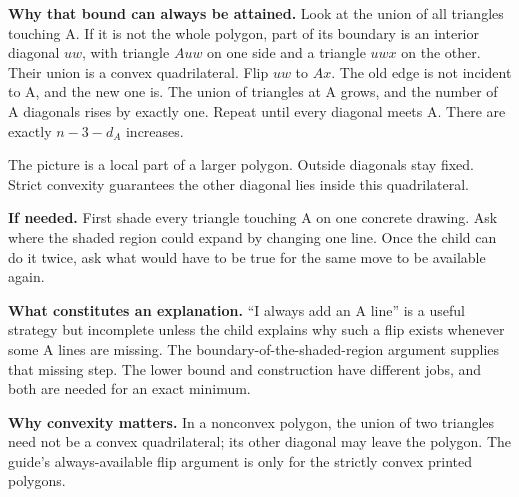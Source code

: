 \documentclass[11pt,letterpaper]{article}
\newcommand{\hint}[1]{\par\textbf{If needed.} #1\par}
\begin{document}
\textbf{Why that bound can always be attained.} Look at the union of all triangles touching A. If it is not the whole polygon, part of its boundary is an interior diagonal $uw$, with triangle $Auw$ on one side and a triangle $uwx$ on the other. Their union is a convex quadrilateral. Flip $uw$ to $Ax$. The old edge is not incident to A, and the new one is. The union of triangles at A grows, and the number of A diagonals rises by exactly one. Repeat until every diagonal meets A. There are exactly $n-3-d_A$ increases.
\begin{center}
\end{center}
The picture is a local part of a larger polygon. Outside diagonals stay fixed. Strict convexity guarantees the other diagonal lies inside this quadrilateral.

\hint{First shade every triangle touching A on one concrete drawing. Ask where the shaded region could expand by changing one line. Once the child can do it twice, ask what would have to be true for the same move to be available again.}
\textbf{What constitutes an explanation.} ``I always add an A line'' is a useful strategy but incomplete unless the child explains why such a flip exists whenever some A lines are missing. The boundary-of-the-shaded-region argument supplies that missing step. The lower bound and construction have different jobs, and both are needed for an exact minimum.

\textbf{Why convexity matters.} In a nonconvex polygon, the union of two triangles need not be a convex quadrilateral; its other diagonal may leave the polygon. The guide's always-available flip argument is only for the strictly convex printed polygons.
\end{document}
